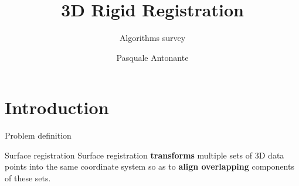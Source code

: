\documentclass[aspectratio=1610]{beamer}
\title{3D Rigid Registration}
\subtitle{Algorithms survey}
\author{Pasquale Antonante}
\begin{document}
\maketitle


\section{Introduction}
\begin{frame}[fragile]{Problem definition}
  \begin{alertblock}{Surface registration}
  Surface registration \textbf{transforms} multiple sets of 3D data points into the same coordinate system so as to \textbf{align overlapping} components of these sets.
\end{alertblock}
\end{frame}
\end{document}
